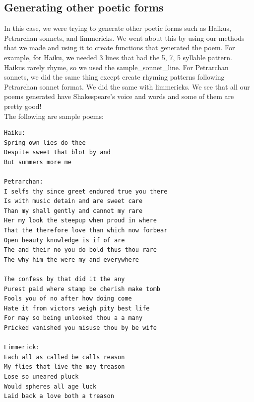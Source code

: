 \subsection{Generating other poetic forms}
\medskip
In this case, we were trying to generate other poetic forms such as Haikus, Petrarchan sonnets, and limmericks. We went about this by using our methods that we made and using it to create functions that generated the poem. For example, for Haiku, we needed 3 lines that had the 5, 7, 5 syllable pattern. Haikus rarely rhyme, so we used the sample_sonnet_line. For Petrarchan sonnets, we did the same thing except create rhyming patterns following Petrarchan sonnet format. We did the same with limmericks. We see that all our poems generated have Shakespeare's voice and words and some of them are pretty good! \\
The following are sample poems: 
\begin{verbatim}
Haiku: 
Spring own lies do thee
Despite sweet that blot by and
But summers more me

Petrarchan:
I selfs thy since greet endured true you there
Is with music detain and are sweet care
Than my shall gently and cannot my rare
Her my look the steepup when proud in where
That the therefore love than which now forbear
Open beauty knowledge is if of are
The and their no you do bold thus thou rare
The why him the were my and everywhere

The confess by that did it the any
Purest paid where stamp be cherish make tomb
Fools you of no after how doing come
Hate it from victors weigh pity best life
For may so being unlooked thou a a many
Pricked vanished you misuse thou by be wife

Limmerick:
Each all as called be calls reason
My flies that live the may treason
Lose so uneared pluck
Would spheres all age luck
Laid back a love both a treason
\end{verbatim}

